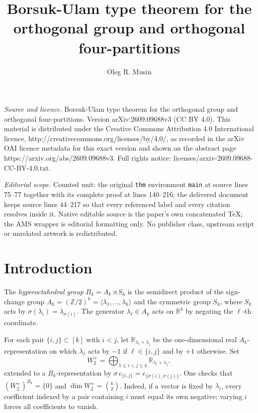 \documentclass[10pt,a4paper]{amsart}
\begin{document}
\title[Borsuk-Ulam type theorem for the orthogonal group and orthog]{Borsuk-Ulam type theorem for the orthogonal group and orthogonal four-partitions}
\author{Oleg R. Musin}
\date{}
\maketitle
\noindent\emph{Source and licence.} Borsuk-Ulam type theorem for the orthogonal group and orthogonal four-partitions. Version arXiv:2609.09688v3 (CC BY 4.0). This material is distributed under the Creative Commons Attribution 4.0 International licence, http://creativecommons.org/licenses/by/4.0/, as recorded in the arXiv OAI licence metadata for this exact version and shown on the abstract page https://arxiv.org/abs/2609.09688v3. Full rights notice: licenses/arxiv-2609.09688-CC-BY-4.0.txt.\par\smallskip
\noindent\textit{Editorial scope.} Counted unit: the original \texttt{thm} environment \texttt{main} at source lines 75--77 together with its complete proof at lines 140--216; the delivered document keeps source lines 44--217 so that every referenced label and every citation resolves inside it. Native editable source is the paper's own concatenated TeX; the AMS wrapper is editorial formatting only. No publisher class, upstream script or unrelated artwork is redistributed.
\section{Introduction}

The \emph{hyperoctahedral group} $B_k = A_k \rtimes S_k$ is the
semidirect product of the sign-change group
$A_k = (\mathbb{Z}/2)^k = \langle\lambda_1,\ldots,\lambda_k\rangle$
and the symmetric group $S_k$, where $S_k$ acts by
$\sigma(\lambda_i)=\lambda_{\sigma(i)}$.
The generator $\lambda_\ell \in A_k$ acts on $\mathbb{R}^k$ by
negating the $\ell$-th coordinate.

For each pair $\{i,j\}\subset[k]$ with $i<j$, let
$\mathbb{R}_{\lambda_i+\lambda_j}$ be the one-dimensional real
$A_k$-representation on which $\lambda_\ell$ acts by $-1$ if
$\ell\in\{i,j\}$ and by $+1$ otherwise.  Set
\[
 W_2^+ = \bigoplus_{1\le i<j\le k}\mathbb{R}_{\lambda_i+\lambda_j},
\]
extended to a $B_k$-representation by
$\sigma\,e_{\{i,j\}}=e_{\{\sigma(i),\sigma(j)\}}$.
One checks that $(W_2^+)^{B_k}=\{0\}$ and
$\dim W_2^+=\binom{k}{2}$.  Indeed, if a vector is fixed by
$\lambda_i$, every coefficient indexed by a pair containing $i$ must
equal its own negative; varying $i$ forces all coefficients to vanish.
\end{document}

